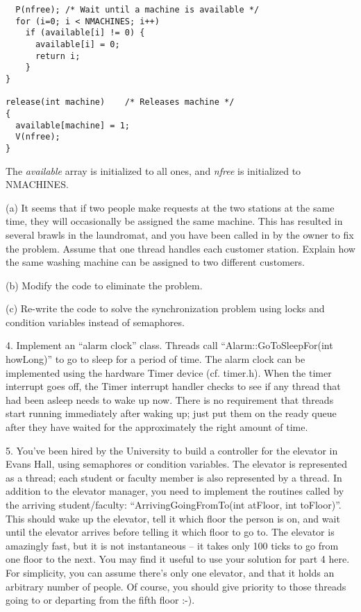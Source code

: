 \begin{description}
\begin{verbatim}
  P(nfree);	/* Wait until a machine is available */
  for (i=0; i < NMACHINES; i++)
    if (available[i] != 0) {
      available[i] = 0;
      return i;
    }
}

release(int machine)	/* Releases machine */
{
  available[machine] = 1;
  V(nfree);
}
\end{verbatim}

The {\em available} array is initialized to all ones, and {\em nfree} is
initialized to NMACHINES.

\begin{description}

\item{(a)} It seems that
if two people make requests at the two stations at the same time, they
will occasionally be assigned the same machine.  This has resulted in
several brawls in the laundromat, and you have been called in by the
owner to fix the problem.  Assume that one thread handles each
customer station.  Explain how the same washing machine can be assigned
to two different customers.

\item{(b)} Modify the code to eliminate the problem.

\item{(c)} Re-write the code to solve the synchronization problem 
using locks and condition variables instead of semaphores.

\end{description}

\item{4.} Implement an ``alarm clock'' class.
Threads call ``Alarm::GoToSleepFor(int howLong)'' to go to sleep for
a period of time.  The alarm clock can be implemented using the hardware
Timer device (cf. timer.h). When the timer interrupt goes off, the 
Timer interrupt
handler checks to see if any thread that had been asleep needs to wake up now.
There is no requirement that threads start running immediately after
waking up; just put them on the ready queue after they have waited for
the approximately the right amount of time.

\item{5.} You've been hired by the University to build a controller
for the elevator in Evans Hall, using semaphores or condition variables.
The elevator is represented as a thread; each student or faculty member 
is also represented by a thread.   In addition to the elevator manager,
you need to implement the routines called by the arriving student/faculty:
``ArrivingGoingFromTo(int atFloor, int toFloor)''.   This should wake
up the elevator, tell it which floor the person is on, and wait until
the elevator arrives before telling it which floor to go to.
The elevator is amazingly fast, but it is not instantaneous -- it takes 
only 100 ticks to go from one floor to the next.   You may find it useful 
to use your solution for part 4 here.  For simplicity, you can assume 
there's only one elevator, and that it holds an arbitrary number of people.
Of course, you should give priority to those threads 
going to or departing from the fifth floor :-).


\end{description}
